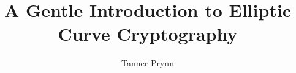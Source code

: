 \documentclass{article}
\begin{document}
\title{A Gentle Introduction to Elliptic Curve Cryptography}
\author{Tanner Prynn}
\maketitle
\end{document}
